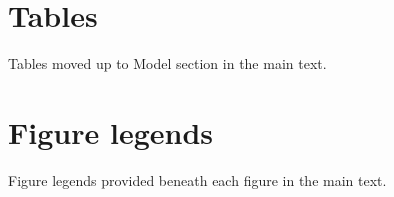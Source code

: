 \documentclass[11pt]{article}
\begin{document}
\section{Tables}
\renewcommand{\thetable}{\arabic{table}}
\setcounter{table}{0}

Tables moved up to Model section in the main text.

\section{Figure legends}

Figure legends provided beneath each figure in the main text.





\end{document}
